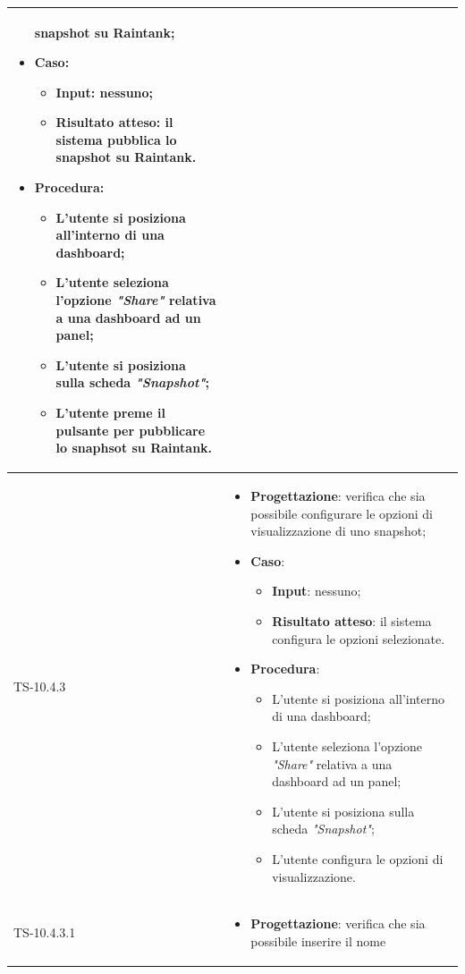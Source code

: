 \begin{longtable}{|C{2.5cm}|C{13cm}|}
\begin{itemize}
	snapshot su Raintank;
	\item \textbf{Caso}: 
	\begin{itemize}
		\item \textbf{Input}: nessuno;
		\item \textbf{Risultato atteso}: il sistema pubblica lo snapshot su Raintank.
	\end{itemize}
	\item \textbf{Procedura}:
	\begin{itemize}
		\item L'utente si posiziona all'interno di una dashboard;
		\item L'utente seleziona l'opzione \emph{"Share"} relativa a una dashboard ad un panel;
		\item L'utente si posiziona sulla scheda \emph{"Snapshot"};
		\item L'utente preme il pulsante per pubblicare lo snaphsot su Raintank.
	\end{itemize} 
\end{itemize}
	 \\
	\hline
	{TS-10.4.3} & 
\begin{itemize}
	\item \textbf{Progettazione}: verifica che sia possibile configurare le
	opzioni di visualizzazione di uno snapshot;
	\item \textbf{Caso}: 
	\begin{itemize}
		\item \textbf{Input}: nessuno;
		\item \textbf{Risultato atteso}: il sistema configura le opzioni selezionate.
	\end{itemize}
	\item \textbf{Procedura}:
	\begin{itemize}
		\item L'utente si posiziona all'interno di una dashboard;
		\item L'utente seleziona l'opzione \emph{"Share"} relativa a una dashboard ad un panel;
		\item L'utente si posiziona sulla scheda \emph{"Snapshot"};
		\item L'utente configura le opzioni di visualizzazione.
	\end{itemize} 
\end{itemize}
	\\
	\hline
	{TS-10.4.3.1} &
\begin{itemize}
	\item \textbf{Progettazione}: verifica che sia possibile inserire il nome

\end{itemize}
\end{longtable}
